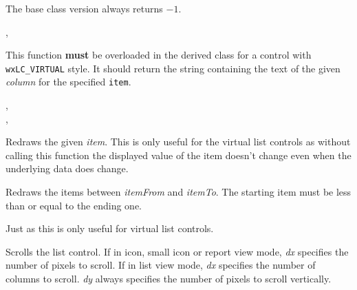 The base class version always returns $-1$.


,\\


\label{wxlistctrlongetitemtext}


This function {\bf must} be overloaded in the derived class for a control with 
{\tt wxLC\_VIRTUAL} style. It should return the string containing the text of
the given {\it column} for the specified {\tt item}.


,\\
,\\


\label{wxlistctrlrefreshitem}


Redraws the given {\it item}. This is only useful for the virtual list controls
as without calling this function the displayed value of the item doesn't change
even when the underlying data does change.





\label{wxlistctrlrefreshitems}


Redraws the items between {\it itemFrom} and {\it itemTo}. The starting item
must be less than or equal to the ending one.

Just as  this is only useful for
virtual list controls.



\label{wxlistctrlscrolllist}


Scrolls the list control. If in icon, small icon or report view mode, 
{\it dx} specifies the number of pixels to scroll. If in list view mode, 
{\it dx} specifies the number of columns to scroll. {\it dy} always specifies
the number of pixels to scroll vertically.

